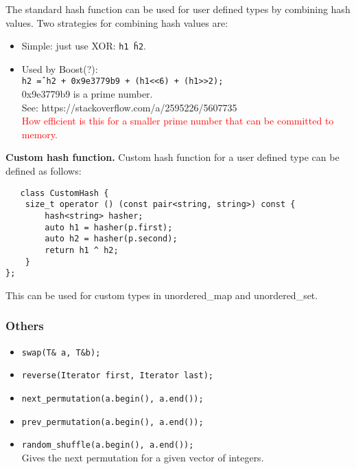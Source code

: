 The standard hash function can be used for user defined types by combining hash values.
Two strategies for combining hash values are:
\begin{itemize}
    \item Simple: just use XOR: \texttt{h1 \^ h2}.
    \item Used by Boost(?):\\
    \texttt{h2 \^= h2 + 0x9e3779b9 + (h1<<6) + (h1>>2);}\\
    0x9e3779b9 is a prime number.\\
    See: https://stackoverflow.com/a/2595226/5607735\\
    \textcolor{red}{How efficient is this for a smaller prime number that can be committed to memory.}
\end{itemize}

\textbf{Custom hash function.}
Custom hash function for a user defined type can be defined as follows:
\begin{verbatim}
   class CustomHash {
    size_t operator () (const pair<string, string>) const {
        hash<string> hasher;
        auto h1 = hasher(p.first);
        auto h2 = hasher(p.second);
        return h1 ^ h2;
    }
}; 
\end{verbatim}

This can be used for custom types in unordered\_map and unordered\_set.

\subsubsection{Others}

\begin{itemize}
\item \texttt{swap(T\& a, T\&b);}\\
\item \texttt{reverse(Iterator first, Iterator last);}
\item \texttt{next\_permutation(a.begin(), a.end());}\\
\item \texttt{prev\_permutation(a.begin(), a.end());}\\
\item \texttt{random\_shuffle(a.begin(), a.end());}\\
Gives the next permutation for a given vector of integers.
\end{itemize}

\vfill \null
\columnbreak 


